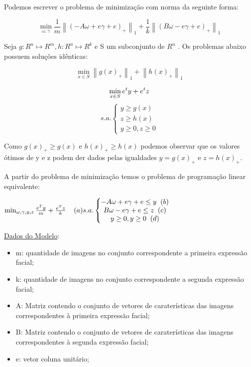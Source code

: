 Podemos escrever o problema de minimização com norma da seguinte forma:

$$\min_{\omega ,\gamma }\frac{1}{m}\left \| \left ( -A\omega + e\gamma  + e \right )_{+} \right \|_{1} + \frac{1}{k}\left \| \left ( B\omega - e\gamma + e  \right )_{+} \right \|_{1}$$

Seja $g:R^{n} \mapsto R^{m} , h:R^{n} \mapsto R^{k}$ e S um subconjunto de $R^{n}$ . Os problemas abaixo possuem soluções idênticas:

$$\min_{x\in S}\left \| g(x)_{+} \right \|_{1} + \left \| h(x)_{+} \right \|_{1}$$


$$\min_{x\in S} e^{t}y + e^{t}z\\$$
$$ s.a.\left\{\begin{matrix}y\geq g(x)\\ z\geq h(x)\\ y\geq 0, z\geq0\end{matrix}\right.$$

Como $g(x)_{+}\geq g(x)$ e $h(x)_{+}\geq h(x)$ podemos observar que os valores ótimos de y e z podem der dados pelas igualdades $y=g(x)_{+}$ e $z=h(x)_{+}$.

A partir do problema de minimização temos o problema de programação linear equivalente:

$\min_{\omega ,\gamma ,y,z}\frac{e^{T}y}{m}+\frac{e^{T}z}{k} \; \; \; \; (a)\\
s.a.\left\{\begin{matrix}-A\omega +e\gamma+e\leq y\; \; (b)\\B\omega -e\gamma+e\leq  z\; \; (c)\\ y\geq 0,y\geq 0\; \; (d)\end{matrix}\right.$

\underline{Dados do Modelo}:
\begin{itemize}
\item{m}: quantidade de imagens no conjunto correspondente a primeira expressão facial;
\item{k}: quantidade de imagens no conjunto correspondente a segunda expressão facial;
\item{A}: Matriz contendo o conjunto de vetores de caraterísticas das imagens correspondentes à primeira expressão facial;
\item{B}: Matriz contendo o conjunto de vetores de caraterísticas das imagens correspondentes à segunda expressão facial;
\item{e}:  vetor coluna unitário;
\end{itemize}

